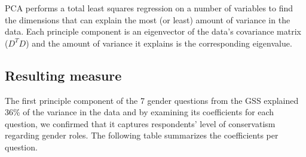\documentclass{article}
\begin{document}
PCA performs a total least squares regression on a number of variables
to find the dimensions that can explain the most (or least) amount of
variance in the data. Each principle component is an eigenvector of the
data's covariance matrix (\(D^TD\)) and the amount of variance
it explains is the corresponding eigenvalue.

\subsection{Resulting measure}\label{resulting-measure}

The first principle component of the 7 gender questions from the GSS
explained 36\% of the variance in the data and by examining its
coefficients for each question, we confirmed that it captures
respondents' level of conservatism regarding gender roles. The following
table summarizes the coefficients per question.
\end{document}
